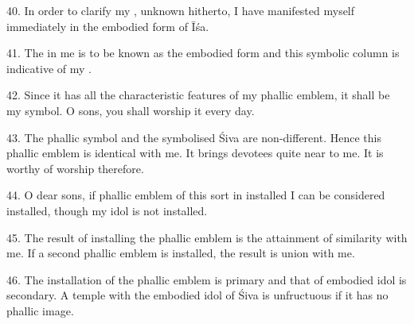 40. In order to clarify my , unknown hitherto, I have manifested
myself immediately in the embodied form of Īśa.

41. The  in me is to be known as the embodied form and this symbolic
column is indicative of my .

42. Since it has all the characteristic features of my phallic emblem, it shall
be my symbol. O sons, you shall worship it every day.

43. The phallic symbol and the symbolised Śiva are non-different. Hence this
phallic emblem is identical with me. It brings devotees quite near to me. It is
worthy of worship therefore.

44. O dear sons, if phallic emblem of this sort in installed I can be considered
installed, though my idol is not installed.

45. The result of installing the phallic emblem is the attainment of similarity
with me. If a second phallic emblem is installed, the result is union with me.

46. The installation of the phallic emblem is primary and that of embodied idol
is secondary. A temple with the embodied idol of Śiva is unfructuous if it has
no phallic image.
